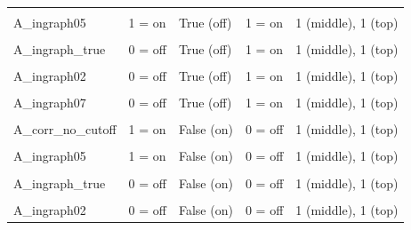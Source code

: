 \documentclass[
]{article}
\begin{document}
\begin{longtable}[t]{>{\raggedright\arraybackslash}p{8em}llll}
\cellcolor{gray!10}{A\_ingraph02} & \cellcolor{gray!10}{1 = on} & \cellcolor{gray!10}{True (off)} & \cellcolor{gray!10}{1 = on} & \cellcolor{gray!10}{1 (middle), 1 (top)}\\
A\_ingraph05 & 1 = on & True (off) & 1 = on & 1 (middle), 1 (top)\\
\cellcolor{gray!10}{A\_ingraph07} & \cellcolor{gray!10}{1 = on} & \cellcolor{gray!10}{True (off)} & \cellcolor{gray!10}{1 = on} & \cellcolor{gray!10}{1 (middle), 1 (top)}\\
\addlinespace
A\_ingraph\_true & 0 = off & True (off) & 1 = on & 1 (middle), 1 (top)\\
\cellcolor{gray!10}{A\_corr\_no\_cutoff} & \cellcolor{gray!10}{0 = off} & \cellcolor{gray!10}{True (off)} & \cellcolor{gray!10}{1 = on} & \cellcolor{gray!10}{1 (middle), 1 (top)}\\
A\_ingraph02 & 0 = off & True (off) & 1 = on & 1 (middle), 1 (top)\\
\cellcolor{gray!10}{A\_ingraph05} & \cellcolor{gray!10}{0 = off} & \cellcolor{gray!10}{True (off)} & \cellcolor{gray!10}{1 = on} & \cellcolor{gray!10}{1 (middle), 1 (top)}\\
A\_ingraph07 & 0 = off & True (off) & 1 = on & 1 (middle), 1 (top)\\
\addlinespace
\cellcolor{gray!10}{A\_ingraph\_true} & \cellcolor{gray!10}{1 = on} & \cellcolor{gray!10}{False (on)} & \cellcolor{gray!10}{0 = off} & \cellcolor{gray!10}{1 (middle), 1 (top)}\\
A\_corr\_no\_cutoff & 1 = on & False (on) & 0 = off & 1 (middle), 1 (top)\\
\cellcolor{gray!10}{A\_ingraph02} & \cellcolor{gray!10}{1 = on} & \cellcolor{gray!10}{False (on)} & \cellcolor{gray!10}{0 = off} & \cellcolor{gray!10}{1 (middle), 1 (top)}\\
A\_ingraph05 & 1 = on & False (on) & 0 = off & 1 (middle), 1 (top)\\
\cellcolor{gray!10}{A\_ingraph07} & \cellcolor{gray!10}{1 = on} & \cellcolor{gray!10}{False (on)} & \cellcolor{gray!10}{0 = off} & \cellcolor{gray!10}{1 (middle), 1 (top)}\\
\addlinespace
A\_ingraph\_true & 0 = off & False (on) & 0 = off & 1 (middle), 1 (top)\\
\cellcolor{gray!10}{A\_corr\_no\_cutoff} & \cellcolor{gray!10}{0 = off} & \cellcolor{gray!10}{False (on)} & \cellcolor{gray!10}{0 = off} & \cellcolor{gray!10}{1 (middle), 1 (top)}\\
A\_ingraph02 & 0 = off & False (on) & 0 = off & 1 (middle), 1 (top)\\

\end{longtable}
\end{document}
